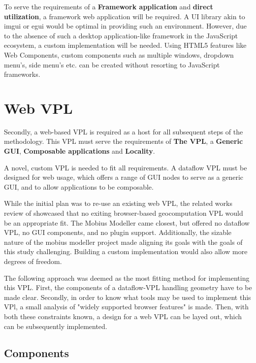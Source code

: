 To serve the requirements of a \textbf{Framework application} and \textbf{direct utilization}, a framework web application will be required. 
A UI library akin to imgui \citep*{cornut_dear_2022} or egui \citep*{ernerfeldt_egui_2022} would be optimal in providing such an environment. 
However, due to the absence of such a desktop application-like framework in the JavaScript ecosystem, a custom implementation will be needed. 
Using HTML5 features like Web Components, custom components such as multiple windows, dropdown menu's, side menu's etc. can be created without resorting to JavaScript frameworks.

\section{Web VPL} 
\label{sec:method:base-vpl}

Secondly, a web-based VPL is required as a host for all subsequent steps of the methodology. 
This VPL must serve the requirements of \textbf{The VPL}, a \textbf{Generic GUI}, \textbf{Composable applications} and \textbf{Locality}.

A novel, custom VPL is needed to fit all requirements. 
A dataflow VPL must be designed for web usage, which offers a range of \ac{GUI} nodes to serve as a generic GUI, and to allow applications to be composable. 

While the initial plan was to re-use an existing web VPL, the related works review of  showcased that no exiting browser-based geocomputation VPL would be an appropriate fit.
The Mobius Modeller \citep{janssen_mobius_2021} came closest, but offered no dataflow VPL, no GUI components, and no plugin support. 
Additionally, the sizable nature of the mobius modeller project made aligning its goals with the goals of this study challenging. 
Building a custom implementation would also allow more degrees of freedom.

The following approach was deemed as the most fitting method for implementing this VPL. 
First, the components of a dataflow-VPL handling geometry have to be made clear.
Secondly, in order to know what tools may be used to implement this VPl, a small analysis of "widely supported browser features" is made. 
Then, with both these constraints known, a design for a web VPL can be layed out, which can be subsequently implemented. 

\subsection{Components}

